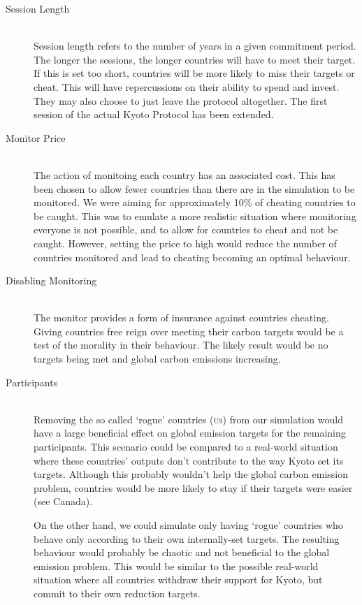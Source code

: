 \begin{description}
\item[Session Length] \hfill \\

Session length refers to the number of years in a given commitment period. The longer the sessions, the longer countries will have to meet their target. If this is set too short, countries will be more likely to miss their targets or cheat. This will have repercussions on their ability to spend and invest. They may also choose to just leave the protocol altogether.  The first session of the actual Kyoto Protocol has been extended.

\item[Monitor Price] \hfill \\

The action of monitoing each country has an associated cost. This has been chosen to allow fewer countries than there are in the simulation to be monitored. We were aiming for approximately 10\% of cheating countries to be caught. This was to emulate a more realistic situation where monitoring everyone is not possible, and to allow for countries to cheat and not be caught. However, setting the price to high would reduce the number of countries monitored and lead to cheating becoming an optimal behaviour.

\item[Disabling Monitoring] \hfill \\

The monitor provides a form of insurance against countries cheating. Giving countries free reign over meeting their carbon targets would be a test of the morality in their behaviour. The likely result would be no targets being met and global carbon emissions increasing.

\item[Participants] \hfill \\

Removing the so called `rogue' countries (\textsc{us}) from our simulation would have a large beneficial effect on global emission  targets for the remaining participants. This scenario could be compared to a real-world situation where these countries' outputs don't contribute to the way Kyoto set its targets. Although this probably wouldn't help the global carbon emission problem, countries would be more likely to stay if their targets were easier (see Canada).

On the other hand, we could simulate only having `rogue' countries who behave only according to their own internally-set targets. The resulting behaviour would probably be chaotic and not beneficial to the global emission problem. This would be similar to the possible real-world situation where all countries withdraw their support for Kyoto, but commit to their own reduction targets.


\end{description}
